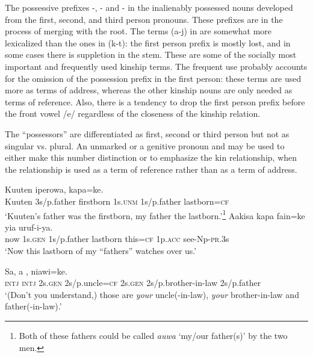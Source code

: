 The possessive prefixes -, - and - in the inalienably possessed nouns developed from the first, second, and third person pronouns. These prefixes are in the process of merging with the root. The terms (a-j) in  are somewhat more lexicalized than the ones in (k-t): the first person prefix is mostly lost, and in some cases there is suppletion in the stem. These are some of the socially most important and frequently used kinship terms. The frequent use probably accounts for the omission of the possession prefix in the first person: these terms are used more as terms of address, whereas the other kinship nouns are only needed as terms of reference. Also, there is a tendency to drop the first person prefix before the front vowel /e/ regardless of the closeness of the kinship relation.

The ``possessors'' are differentiated as first, second or third person but not as singular vs. plural. An unmarked  or a genitive pronoun  and  may be used to either make this number distinction or to emphasize the kin relationship, when the relationship is used as a term of reference rather than as a term of address.

\ea%
\label{ex:3:x1311}
\gll Kuuten  iperowa,   kapa=ke. \\
Kuuten 3s/p.father firstborn 1s.\textsc{unm} 1s/p.father lastborn=\textsc{cf}\\
\glt`Kuuten's father was the firstborn, my father the lastborn.'\footnote{Both of these fathers could be called \textit{auwa} `my/our father(s)' by the two men.}
\z
\ea%
\label{ex:3:x28}
\gll Aakisa    kapa fain=ke yia uruf-i-ya. \\
now 1s.\textsc{gen} 1s/p.father lastborn this=\textsc{cf} 1p.\textsc{acc} see-Np-\textsc{pr}.3s\\
\glt`Now this lastborn of my ``fathers'' watches over us.'
\z

\ea%
\label{ex:3:x1312}
\gll Sa, a  ,   niawi=ke.\\
\textsc{intj} \textsc{intj} 2s.\textsc{gen} 2s/p.uncle=\textsc{cf} 2s.\textsc{gen} 2s/p.brother-in-law 2s/p.father\\
\glt`(Don't you understand,) those are \textit{your} uncle(-in-law), \textit{your} brother-in-law and father(-in-law).'
\z

